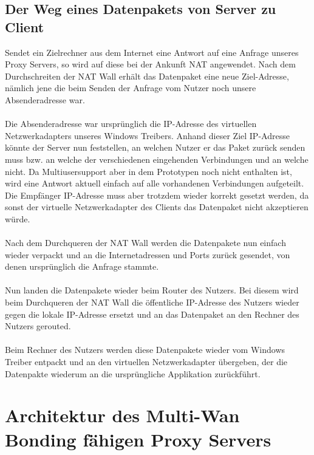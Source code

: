 \subsection{Der Weg eines Datenpakets von Server zu Client}
Sendet ein Zielrechner aus dem Internet eine Antwort auf eine Anfrage unseres Proxy Servers, so wird auf diese bei der Ankunft NAT angewendet. Nach dem Durchschreiten der NAT Wall erhält das Datenpaket eine neue Ziel-Adresse, nämlich jene die beim Senden der Anfrage vom Nutzer noch unsere Absenderadresse war.
\\\\
Die Absenderadresse war ursprünglich die IP-Adresse des virtuellen Netzwerkadapters unseres Windows Treibers. Anhand dieser Ziel IP-Adresse könnte der Server nun feststellen, an welchen Nutzer er das Paket zurück senden muss bzw. an welche der verschiedenen eingehenden Verbindungen und an welche nicht. Da Multiusersupport aber in dem Prototypen noch nicht enthalten ist, wird eine Antwort aktuell einfach auf alle vorhandenen Verbindungen aufgeteilt. Die Empfänger IP-Adresse muss aber trotzdem wieder korrekt gesetzt werden, da sonst der virtuelle Netzwerkadapter des Clients das Datenpaket nicht akzeptieren würde.
\\\\
Nach dem Durchqueren der NAT Wall werden die Datenpakete nun einfach wieder verpackt und an die Internetadressen und Ports zurück gesendet, von denen ursprünglich die Anfrage stammte.
\\\\
Nun landen die Datenpakete wieder beim Router des Nutzers. Bei diesem wird beim Durchqueren der NAT Wall die öffentliche IP-Adresse des Nutzers wieder gegen die lokale IP-Adresse ersetzt und an das Datenpaket an den Rechner des Nutzers gerouted.
\\\\ 
Beim Rechner des Nutzers werden diese Datenpakete wieder vom Windows Treiber entpackt und an den virtuellen Netzwerkadapter übergeben, der die Datenpakte wiederum an die ursprüngliche Applikation zurückführt.

\newpage
\section{Architektur des Multi-Wan Bonding fähigen Proxy Servers}
